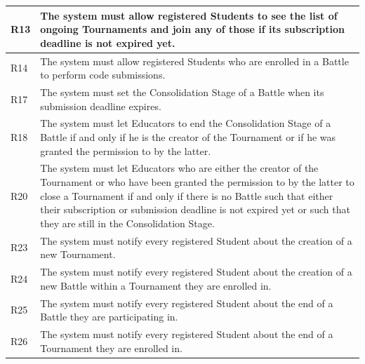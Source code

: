 \documentclass{Configuration_Files/Template}
\begin{document}
\begin{xltabular}{\textwidth}{| l | X |}
\hline
R13 & The system must allow registered Students to see the list of ongoing Tournaments and join any of those if its subscription deadline is not expired yet.\\ [1ex]
\hline
R14 & The system must allow registered Students who are enrolled in a Battle to perform code submissions.\\ [1ex]
\hline
R17 & The system must set the Consolidation Stage of a Battle when its submission deadline expires.\\ [1ex]
\hline
R18 & The system must let Educators to end the Consolidation Stage of a Battle if and only if he is the creator of the Tournament or if he was granted the permission to by the latter.\\ [1ex]
\hline
R20 & The system must let Educators who are either the creator of the Tournament or who have been granted the permission to by the latter to close a Tournament if and only if there is no Battle such that either their subscription or submission deadline is not expired yet or such that they are still in the Consolidation Stage.\\ [1ex]
\hline
R23 & The system must notify every registered Student about the creation of a new Tournament.\\ [1ex]
\hline
R24 & The system must notify every registered Student about the creation of a new Battle within a Tournament they are enrolled in.\\ [1ex]
\hline
R25 & The system must notify every registered Student about the end of a Battle they are participating in.\\ [1ex]
\hline
R26 & The system must notify every registered Student about the end of a Tournament they are enrolled in.\\ [1ex]
\hline
\end{xltabular}
\end{document}
